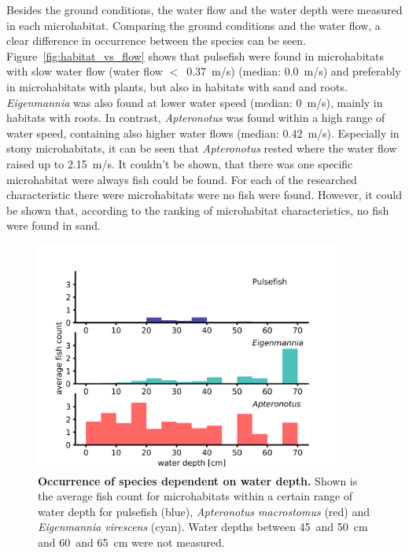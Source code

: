 Besides the ground conditions, the water flow and the water depth were measured in each microhabitat. Comparing the ground conditions and the water flow, a clear difference in occurrence between the species can be seen. Figure~\ref{fig:habitat_vs_flow} shows that pulsefish were found in microhabitats with slow water flow (water flow $<$~0.37~m/s) (median: 0.0~m/s) and preferably in microhabitats with plants, but also in habitats with sand and roots. \textit{Eigenmannia} was also found at lower water speed (median: 0~m/s), mainly in habitats with roots. In contrast, \textit{Apteronotus} was found within a high range of water speed, containing also higher water flows (median: 0.42~m/s). Especially in stony microhabitats, it can be seen that \textit{Apteronotus} rested where the water flow raised up to 2.15~m/s. 
It couldn't be shown, that there was one specific microhabitat were always fish could be found. For each of the researched characteristic there were microhabitats were no fish were found. However, it could be shown that, according to the ranking of microhabitat characteristics, no fish were found in sand.

\begin{figure}[H]
    \centering
    \includegraphics[width=0.9\textwidth]{pictures/Results/JULE_flow_depth2.png}
    \caption{\textbf{Occurrence of species dependent on water depth.} Shown is the average fish count for microhabitats within a certain range of water depth for pulsefish (blue), \textit{Apteronotus macrostomus} (red) and \textit{Eigenmannia virescens} (cyan). Water depths between 45~and 50~cm and 60~and 65~cm were not measured.}
    \label{fig:habitat_vs_depth}
\end{figure}

